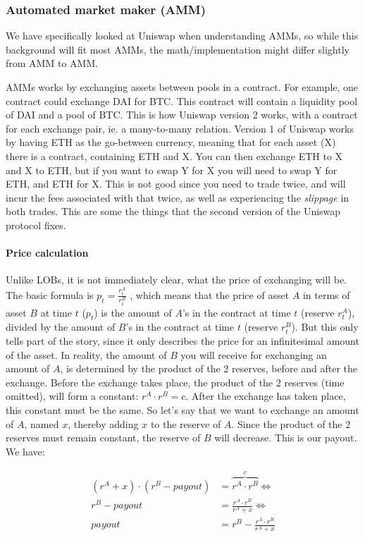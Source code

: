 \subsubsection{Automated market maker (AMM)}
We have specifically looked at Uniswap when understanding AMMs, so while this
background will fit most AMMs, the math/implementation might differ slightly
from AMM to AMM.

AMMs works by exchanging assets between pools in a contract. For example, one
contract could exchange DAI for BTC. This contract will contain a liquidity pool
of DAI and a pool of BTC. This is how Uniswap version 2 works, with a contract
for each exchange pair, ie. a many-to-many relation. Version 1 of Uniswap works
by having ETH as the go-between currency, meaning that for each asset (X) there
is a contract, containing ETH and X. You can then exchange ETH to X and X to
ETH, but if you want to swap Y for X you will need to swap Y for ETH, and ETH
for X. This is not good since you need to trade twice, and will incur the fees
associated with that twice, as well as experiencing the \textit{slippage} in
both trades. This are some the things that the second version of the Uniswap
protocol fixes.

\paragraph{Price calculation}
Unlike LOBs, it is not immediately clear, what the price of exchanging will be.
The basic formula is $p_t=\frac{r^A_t}{r^B_t}$ \cite[eq 1, page 2]{uniswap},
which means that the price of asset $A$ in terms of asset $B$ at time $t$
($p_t$) is the amount of $A$'s in the contract at time $t$ (reserve $r^A_t$),
divided by the amount of $B$'s in the contract at time $t$ (reserve $r^B_t$).
But this only tells part of the story, since it only describes the price for an
infinitesimal amount of the asset. In reality, the amount of $B$ you will receive
for exchanging an amount of $A$, is determined by the product of the 2 reserves,
before and after the exchange. Before the exchange takes place, the product of
the 2 reserves (time omitted), will form a constant: $r^A \cdot r^B = c$. After
the exchange has taken place, this constant must be the same. So let's say that
we want to exchange an amount of $A$, named $x$, thereby adding $x$ to the
reserve of $A$. Since the product of the 2 reserves must remain constant, the
reserve of $B$ will decrease. This is our payout. We have:

\begin{align*}
  (r^A + x) \cdot (r^B - payout) & = \overbrace{r^A \cdot r^B}^{c} \Leftrightarrow \\
  r^B - payout                   & = \frac{r^A \cdot r^B}{r^A + x} \Leftrightarrow \\
  payout                         & = r^B - \frac{r^A \cdot r^B}{r^A + x}
\end{align*}

